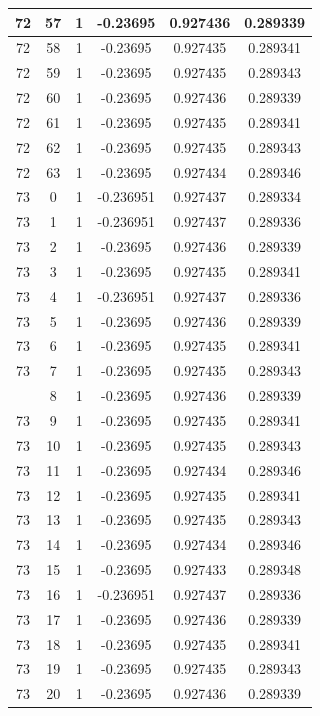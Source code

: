 \documentclass[12pt,a4paper]{article}
\numberwithin{equation}{section}
\numberwithin{figure}{section}
\numberwithin{table}{section}
\begin{document}
\begin{longtable}{|c|c|c|c|c|c|}
72 & 57 & 1 & -0.23695 & 0.927436 & 0.289339 \\ \hline
72 & 58 & 1 & -0.23695 & 0.927435 & 0.289341 \\ \hline
72 & 59 & 1 & -0.23695 & 0.927435 & 0.289343 \\ \hline
72 & 60 & 1 & -0.23695 & 0.927436 & 0.289339 \\ \hline
72 & 61 & 1 & -0.23695 & 0.927435 & 0.289341 \\ \hline
72 & 62 & 1 & -0.23695 & 0.927435 & 0.289343 \\ \hline
72 & 63 & 1 & -0.23695 & 0.927434 & 0.289346 \\ \hline
73 & 0 & 1 & -0.236951 & 0.927437 & 0.289334 \\ \hline
73 & 1 & 1 & -0.236951 & 0.927437 & 0.289336 \\ \hline
73 & 2 & 1 & -0.23695 & 0.927436 & 0.289339 \\ \hline
73 & 3 & 1 & -0.23695 & 0.927435 & 0.289341 \\ \hline
73 & 4 & 1 & -0.236951 & 0.927437 & 0.289336 \\ \hline
73 & 5 & 1 & -0.23695 & 0.927436 & 0.289339 \\ \hline
73 & 6 & 1 & -0.23695 & 0.927435 & 0.289341 \\ \hline
73 & 7 & 1 & -0.23695 & 0.927435 & 0.289343 \\ \hline
\pagebreak
73 & 8 & 1 & -0.23695 & 0.927436 & 0.289339 \\ \hline
73 & 9 & 1 & -0.23695 & 0.927435 & 0.289341 \\ \hline
73 & 10 & 1 & -0.23695 & 0.927435 & 0.289343 \\ \hline
73 & 11 & 1 & -0.23695 & 0.927434 & 0.289346 \\ \hline
73 & 12 & 1 & -0.23695 & 0.927435 & 0.289341 \\ \hline
73 & 13 & 1 & -0.23695 & 0.927435 & 0.289343 \\ \hline
73 & 14 & 1 & -0.23695 & 0.927434 & 0.289346 \\ \hline
73 & 15 & 1 & -0.23695 & 0.927433 & 0.289348 \\ \hline
73 & 16 & 1 & -0.236951 & 0.927437 & 0.289336 \\ \hline
73 & 17 & 1 & -0.23695 & 0.927436 & 0.289339 \\ \hline
73 & 18 & 1 & -0.23695 & 0.927435 & 0.289341 \\ \hline
73 & 19 & 1 & -0.23695 & 0.927435 & 0.289343 \\ \hline
73 & 20 & 1 & -0.23695 & 0.927436 & 0.289339 \\ \hline

\end{longtable}
\end{document}
